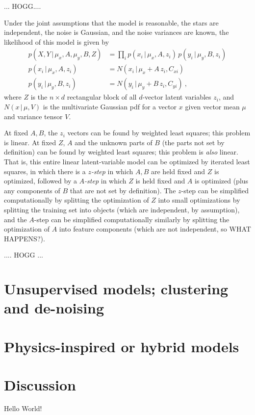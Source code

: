 \documentclass[modern]{aastex631}
\newcommand{\given}{\,|\,}
\begin{document}
  ... HOGG....

Under the joint assumptions that the model is reasonable, the stars are independent, the noise is Gaussian, and the noise variances are known, the likelihood of this model is given by
\begin{align}
  p(X, Y\given \mu_x, A, \mu_y, B, Z) &= \prod_i p(x_i\given \mu_x, A, z_i)\,p(y_i\given \mu_y, B, z_i) \\
  p(x_i\given \mu_x, A, z_i) &= N(x_i\given \mu_x + A\,z_i, C_{xi}) \\
  p(y_i\given \mu_y, B, z_i) &= N(y_i\given \mu_y + B\,z_i, C_{yi}) ~,
\end{align}
where $Z$ is the $n\times d$ rectangular block of all $d$-vector latent variables $z_i$,
and $N(x\given\mu,V)$ is the multivariate Gaussian pdf for a vector $x$ given vector mean $\mu$ and variance tensor $V$.

At fixed $A, B$, the $z_i$ vectors can be found by weighted least squares; this problem is linear.
At fixed $Z$, $A$ and the unknown parts of $B$ (the parts not set by definition) can be found by weighted least squares; this problem is \emph{also} linear.
That is, this entire linear latent-variable model can be optimized by iterated least squares, in which there is a \emph{$z$-step} in which $A, B$ are held fixed and $Z$ is optimized, followed by a \emph{$A$-step} in which $Z$ is held fixed and $A$ is optimized (plus any components of $B$ that are not set by definition).
The $z$-step can be simplified computationally by splitting the optimization of $Z$ into small optimizations by splitting the training set into objects (which are independent, by assumption), and the $A$-step can be simplified computationally similarly by splitting the optimization of $A$ into feature components (which are not independent, so WHAT HAPPENS?).

.... HOGG ...

\section{Unsupervised models; clustering and de-noising}

\section{Physics-inspired or hybrid models}

\section{Discussion}

Hello World!

{}

\end{document}
